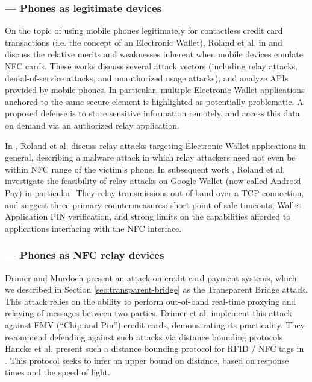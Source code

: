 \subsubsection*{--- Phones as legitimate devices}

On the topic of using mobile phones legitimately for contactless credit card transactions (i.e. the concept of an Electronic Wallet),
    Roland et al. in \cite{roland2012software} and \cite{roland2012practical} discuss the relative merits and weaknesses inherent when mobile devices emulate NFC cards.
These works discuss several attack vectors (including relay attacks, denial-of-service attacks, and unauthorized usage attacks),
    and analyze APIs provided by mobile phones.
In particular, multiple Electronic Wallet applications anchored to the same secure element is highlighted as potentially problematic.
A proposed defense is to store sensitive information remotely, and access this data on demand via an authorized relay application.

In \cite{roland2012relay}, Roland et al. discuss relay attacks targeting Electronic Wallet applications in general,
    describing a malware attack in which relay attackers need not even be within NFC range of the victim's phone.
In subsequent work \cite{roland2013applying}, Roland et al. investigate the feasibility of relay attacks on Google Wallet (now called Android Pay) in particular.
They relay transmissions out-of-band over a TCP connection, and suggest three primary countermeasures:
    short point of sale timeouts, Wallet Application PIN verification, and strong limits on the capabilities afforded to applications interfacing with the NFC interface.

\subsubsection*{--- Phones as NFC relay devices}

Drimer and Murdoch \cite{Drimer:2007:KYE:1362903.1362910} present an attack on credit card payment systems,
    which we described in Section \ref{sec:transparent-bridge} as the Transparent Bridge attack.
This attack relies on the ability to perform out-of-band real-time proxying and relaying of messages between two parties.
Drimer et al. implement this attack against EMV (``Chip and Pin'') credit cards, demonstrating its practicality.
They recommend defending against such attacks via distance bounding protocols.
Hancke et al. present such a distance bounding protocol for RFID / NFC tags in \cite{hancke2005rfid}.
    This protocol seeks to infer an upper bound on distance, based on response times and the speed of light.

